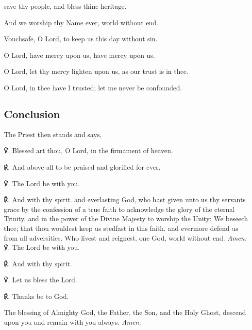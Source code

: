  save thy people, and bless thine heritage.\par
{}
    And we worship thy Name ever, world without end.\par
    Vouchsafe, O Lord, to keep us this day without sin.\par
    O Lord, have mercy upon us, have mercy upon us.\par
    O Lord, let thy mercy lighten upon us, as our trust is in thee.\par
    O Lord, in thee have I trusted; let me never be confounded.
    
\subsection{Conclusion}
\begin{rubric}
    The Priest then stands and says,
\end{rubric}
℣. Blessed art thou, O Lord, in the firmament of heaven.

℟. And above all to be praised and glorified for ever.

℣. The Lord be with you.

℟. And with thy spirit.
{}
 and everlasting God, who hast given unto us thy servants grace by the confession of a true faith to acknowledge the glory of the eternal Trinity, and in the power of the Divine Majesty to worship the Unity: We beseech thee; that thou wouldest keep us stedfast in this faith, and evermore defend us from all adversities. Who livest and reignest, one God, world without end. \textit{Amen.}
℣. The Lord be with you.

℟. And with thy spirit.

℣. Let us bless the Lord.

℟. Thanks be to God.
\par\noindent
\par\noindent
The blessing of Almighty God, the Father, {} the Son, and the Holy Ghost, descend upon you and remain with you always. \textit{Amen.}